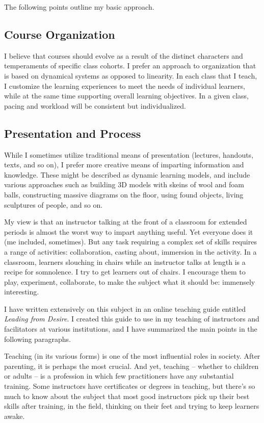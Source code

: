 \documentclass[10pt,DIV09,letterpaper,oneside,headsepline]{scrreprt}
\begin{document}
The following points outline my basic approach.

\subsection{Course Organization}
I believe that courses should evolve as a result of the distinct characters and temperaments of specific class cohorts. I prefer an approach to organization that is based on dynamical systems as opposed to linearity. In each class that I teach, I customize the learning experiences to meet the needs of individual learners, while at the same time supporting overall learning objectives. In a given class, pacing and workload will be consistent but individualized.

\subsection{Presentation and Process}

While I sometimes utilize traditional means of presentation (lectures, handouts, texts, and so on), I prefer more creative means of imparting information and knowledge. These might be described as dynamic learning models, and include various approaches such as building 3D models with skeins of wool and foam balls, constructing massive diagrams on the floor, using found objects, living sculptures of people, and so on.

My view is that an instructor talking at the front of a classroom for extended periods is almost the worst way to impart anything useful. Yet everyone does it (me included, sometimes). But any task requiring a complex set of skills requires a range of activities: collaboration, casting about, immersion in the activity. In a classroom, learners slouching in chairs while an instructor talks at length is a recipe for somnolence. I try to get learners out of chairs. I encourage them to play, experiment, collaborate, to make the subject what it should be: immensely interesting.

I have written extensively on this subject in an online teaching guide entitled \textit{Leading from Desire}. I created this guide to use in my teaching of instructors and facilitators at various institutions, and I have summarized the main points in the following paragraphs.

Teaching (in its various forms) is one of the most influential roles in society. After parenting, it is perhaps the most crucial. And yet, teaching -- whether to children or adults -- is a profession in which few practitioners have any substantial training. Some instructors have certificates or degrees in teaching, but there's so much to know about the subject that most good instructors pick up their best skills after training, in the field, thinking on their feet and trying to keep learners awake.
\end{document}
